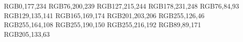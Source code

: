 \usepackage{fancyhdr}								%
\usepackage{ifoddpage}								%
\usepackage{lscape} 								%
\usepackage{epigraph}								%
\setlength\epigraphwidth{8cm}							%
\setlength\epigraphrule{0pt}							%
\usepackage{titlesec}	 							%
\usepackage{color} 									%

\usepackage{graphicx}								%
\usepackage[font={footnotesize},labelfont={bf}]{caption} 		%
\usepackage{fp}									%
\usepackage[final]{pdfpages} 							%
\usepackage{subfigure}								%
\usepackage{pgfplots}								%
\usepackage{tikz}									%
\usepackage{tikz-3dplot}								%

\pgfplotsset{compat=1.17}								%

\tikzexternalize[optimize command away=] 		%

\usepackage{xcolor}									%
\usepackage{color} 									%

\definecolor{blue1}	{RGB}{0,177,234}					%
\definecolor{blue2}	{RGB}{76,200,239}					%
\definecolor{blue3}	{RGB}{127,215,244}					%
\definecolor{blue4}	{RGB}{178,231,248}					%
\definecolor{gray1}	{RGB}{76,84,93}					%
\definecolor{gray2}	{RGB}{129,135,141}					%
\definecolor{gray3}	{RGB}{165,169,174}					%
\definecolor{gray4}	{RGB}{201,203,206}					%
\definecolor{orange1}	{RGB}{255,126,46}				%
\definecolor{orange2}	{RGB}{255,164,108}				%
\definecolor{orange3}	{RGB}{255,190,150}				%
\definecolor{orange4}	{RGB}{255,216,192}				%
\definecolor{purple}	{RGB}{89,89,171}					%
\definecolor{brown}	{RGB}{205,133,63}					%

